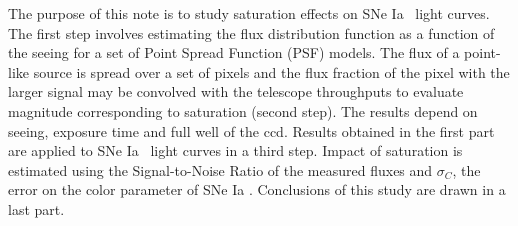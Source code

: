 \documentclass[\docopts]{\docclass}
\newcommand{\sne}{{SNe Ia }}
\begin{document}
The purpose of this note is to study saturation effects on \sne~light curves. The first step involves estimating the flux distribution function as a function of the seeing for a set of Point Spread Function (PSF) models. The flux of a point-like source is spread over a set of pixels and the flux fraction of the pixel with the larger signal may be convolved with the telescope throughputs to evaluate magnitude corresponding to saturation (second step). The results depend on seeing, exposure time and full well of the ccd. Results obtained in the first part are applied to \sne~light curves in a third step. Impact of saturation is estimated using the Signal-to-Noise Ratio of the measured fluxes and $\sigma_C$, the error on the color parameter of \sne. Conclusions of this study are drawn in a last part. 

\end{document}
